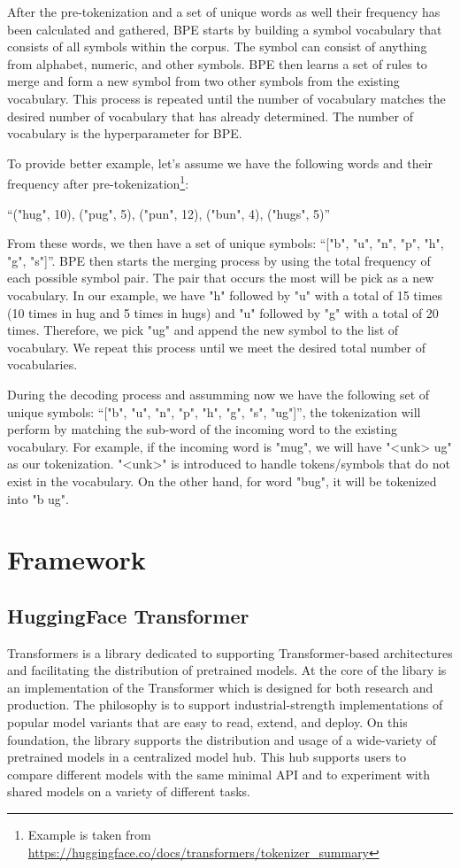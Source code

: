 After the pre-tokenization and a set of unique words as well their frequency has been calculated and gathered, BPE starts by building a symbol vocabulary that consists of all symbols within the corpus. The symbol can consist of anything from alphabet, numeric, and other symbols. BPE then learns a set of rules to merge and form a new symbol from two other symbols from the existing vocabulary. This process is repeated until the number of vocabulary matches the desired number of vocabulary that has already determined. The number of vocabulary is the hyperparameter for BPE.

To provide better example, let's assume we have the following words and their frequency after pre-tokenization\footnote{Example is taken from \url{https://huggingface.co/docs/transformers/tokenizer_summary}}:

\bigskip
``("hug", 10), ("pug", 5), ("pun", 12), ("bun", 4), ("hugs", 5)''
\bigskip

From these words, we then have a set of unique symbols: ``["b", "u", "n", "p", "h", "g", "s"]''. BPE then starts the merging process by using the total frequency of each possible symbol pair. The pair that occurs the most will be pick as a new vocabulary. In our example, we have "h" followed by "u" with a total of 15 times (10 times in hug and 5 times in hugs) and "u" followed by "g" with a total of 20 times. Therefore, we pick "ug" and append the new symbol to the list of vocabulary. We repeat this process until we meet the desired total number of vocabularies.

During the decoding process and assumming now we have the following set of unique symbols: ``["b", "u", "n", "p", "h", "g", "s", "ug"]'', the tokenization will perform by matching the sub-word of the incoming word to the existing vocabulary. For example, if the incoming word is "mug", we will have "<unk> ug" as our tokenization. "<unk>" is introduced to handle tokens/symbols that do not exist in the vocabulary. On the other hand, for word "bug", it will be tokenized into "b ug".


\section{Framework}
\label{sec:framework}
\subsection{HuggingFace Transformer}
Transformers is a library dedicated to supporting Transformer-based architectures and facilitating the distribution of pretrained models. At the core of the libary is an implementation of the Transformer which is designed for both research and production. The philosophy is to support industrial-strength implementations of popular model variants that are easy to read, extend, and deploy. On this foundation, the library supports the distribution and usage of a wide-variety of pretrained models in a centralized model hub. This hub supports users to compare different models with the same minimal API and to experiment with shared models on a variety of different tasks.

